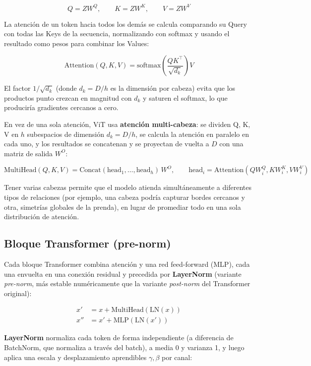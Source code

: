 \documentclass[11pt,a4paper]{article}
\begin{document}
\[
Q = ZW^Q, \qquad K = ZW^K, \qquad V = ZW^V
\]

La atención de un token hacia todos los demás se calcula comparando su
Query con todas las Keys de la secuencia, normalizando con softmax y usando
el resultado como pesos para combinar los Values:

\[
\mathrm{Attention}(Q, K, V) = \mathrm{softmax}\!\left(\frac{QK^\top}{\sqrt{d_k}}\right) V
\]

El factor $1/\sqrt{d_k}$ (donde $d_k = D / h$ es la dimensión por cabeza)
evita que los productos punto crezcan en magnitud con $d_k$ y saturen el
softmax, lo que produciría gradientes cercanos a cero.

En vez de una sola atención, ViT usa \textbf{atención multi-cabeza}: se
dividen Q, K, V en $h$ subespacios de dimensión $d_k = D/h$, se calcula la
atención en paralelo en cada uno, y los resultados se concatenan y se
proyectan de vuelta a $D$ con una matriz de salida $W^O$:

\[
\mathrm{MultiHead}(Q,K,V) = \mathrm{Concat}(\mathrm{head}_1, \dots, \mathrm{head}_h)\,W^O,
\qquad \mathrm{head}_i = \mathrm{Attention}(QW_i^Q, KW_i^K, VW_i^V)
\]

Tener varias cabezas permite que el modelo atienda simultáneamente a
diferentes tipos de relaciones (por ejemplo, una cabeza podría capturar
bordes cercanos y otra, simetrías globales de la prenda), en lugar de
promediar todo en una sola distribución de atención.

\subsection{Bloque Transformer (pre-norm)}

Cada bloque Transformer combina atención y una red feed-forward (MLP), cada
una envuelta en una conexión residual y precedida por \textbf{LayerNorm}
(variante \emph{pre-norm}, más estable numéricamente que la variante
\emph{post-norm} del Transformer original):

\begin{align*}
x' &= x + \mathrm{MultiHead}(\mathrm{LN}(x)) \\
x'' &= x' + \mathrm{MLP}(\mathrm{LN}(x'))
\end{align*}

\textbf{LayerNorm} normaliza cada token de forma independiente (a
diferencia de BatchNorm, que normaliza a través del batch), a media 0 y
varianza 1, y luego aplica una escala y desplazamiento aprendibles
$\gamma, \beta$ por canal:
\end{document}
